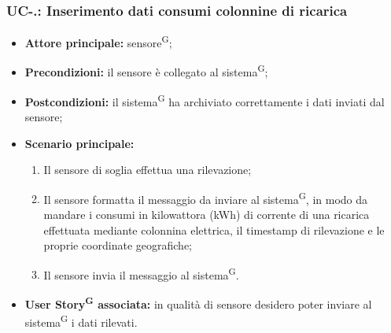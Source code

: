 \documentclass[8pt]{article}
\newcommand{\glossterm}[1]{#1\textsuperscript{G}} %
\begin{document}
\subsubsection*{UC-\theuc .\speconenumber: Inserimento dati consumi colonnine di ricarica}
\begin{itemize}
    \item \textbf{Attore principale:} \glossterm{sensore};
    \item \textbf{Precondizioni:} il sensore è collegato al \glossterm{sistema};
    \item \textbf{Postcondizioni:} il \glossterm{sistema} ha archiviato correttamente i dati inviati dal sensore;
    \item \textbf{Scenario principale:}
        \begin{enumerate}
        \item Il sensore di soglia effettua una rilevazione;
        \item Il sensore formatta il messaggio da inviare al \glossterm{sistema}, in modo da mandare i consumi in kilowattora (kWh) di corrente di una ricarica effettuata mediante colonnina elettrica, il timestamp di rilevazione e le proprie coordinate geografiche;
        \item Il sensore invia il messaggio al \glossterm{sistema}.
        \end{enumerate}
    \item \textbf{\glossterm{User Story} associata:} in qualità di sensore desidero poter inviare al \glossterm{sistema} i dati rilevati.
\end{itemize}
\end{document}
